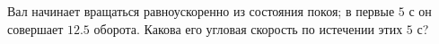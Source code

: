 Вал начинает вращаться равноускоренно из состояния покоя; в первые $5$ с
он совершает $12.5$ оборота. Какова его угловая скорость по истечении
этих $5$ с?
